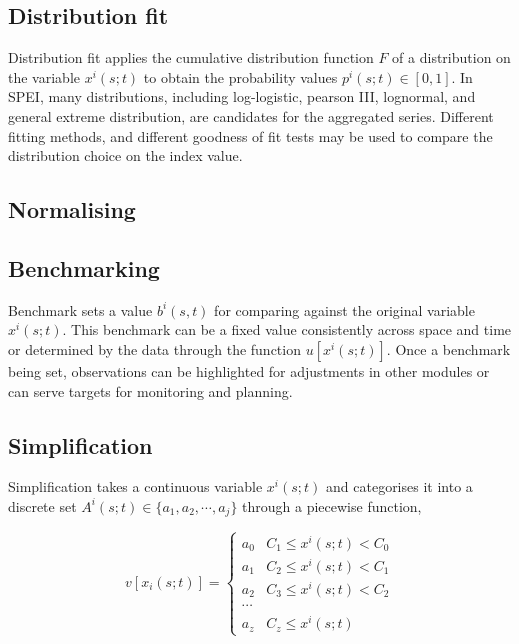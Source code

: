 \documentclass[
]{interact}
\begin{document}
\hypertarget{distribution-fit}{%
\subsection{Distribution fit}\label{distribution-fit}}

Distribution fit applies the cumulative distribution function \(F\) of a
distribution on the variable \(x^i(s; t)\) to obtain the probability
values \(p^i(s;t) \in [0, 1]\). In SPEI, many distributions, including
log-logistic, pearson III, lognormal, and general extreme distribution,
are candidates for the aggregated series. Different fitting methods, and
different goodness of fit tests may be used to compare the distribution
choice on the index value.

\hypertarget{normalising}{%
\subsection{Normalising}\label{normalising}}

\hypertarget{benchmarking}{%
\subsection{Benchmarking}\label{benchmarking}}

Benchmark sets a value \(b^i(s,t)\) for comparing against the original
variable \(x^i(s;t)\). This benchmark can be a fixed value consistently
across space and time or determined by the data through the function
\(u[x^i(s;t)]\). Once a benchmark being set, observations can be
highlighted for adjustments in other modules or can serve targets for
monitoring and planning.

\hypertarget{simplification}{%
\subsection{Simplification}\label{simplification}}

Simplification takes a continuous variable \(x^i(s;t)\) and categorises
it into a discrete set \(A^i(s;t) \in \{a_1, a_2, \cdots, a_j\}\)
through a piecewise function,

\begin{equation}
v[x_i(s;t)] = 
\begin{cases}
a_0 & C_1 \leq x^i(s; t) < C_0 \\
a_1 & C_2 \leq x^i(s; t) < C_1 \\
a_2 & C_3 \leq x^i(s; t) < C_2 \\
\cdots \\
a_z & C_z \leq x^i(s; t)
\end{cases}
\end{equation}
\end{document}
